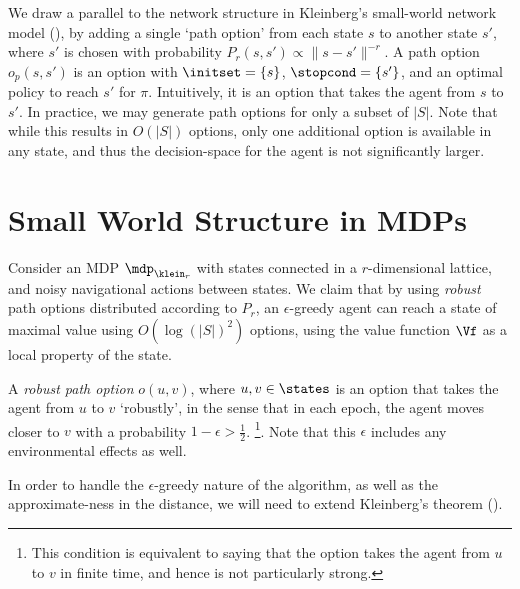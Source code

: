 We draw a parallel to the network structure in Kleinberg's small-world
network model (), by adding a single `path
option' from each state $s$ to another state $s'$, where $s'$ is chosen
with probability $P_r(s,s') \propto \|s-s'\|^{-r}$.  A path option
$o_p(s,s')$ is an option with $\initset = \{s\}$, $\stopcond = \{s'\}$,
and an optimal policy to reach $s'$ for $\pi$.  Intuitively, it is an
option that takes the agent from $s$ to $s'$. In practice, we may
generate path options for only a subset of $|S|$. Note that while this
results in $O(|S|)$ options, only one additional option is available in
any state, and thus the decision-space for the agent is not
significantly larger.

\section{Small World Structure in MDPs}
\label{sec:sw:theory}

Consider an MDP $\mdp_{\klein_r}$ with states connected in
a $r$-dimensional lattice, and noisy navigational actions between
states. We claim that by using {\em robust} path options distributed
according to $P_r$, an $\epsilon$-greedy agent can reach a state of
maximal value using $O(\log(|S|)^2)$ options, using the value function
$\Vf$ as a local property of the state. 

\begin{definition}
    A {\em robust path option} $o(u,v)$, where $u,v \in \states$ is an
    option that takes the agent from $u$ to $v$ `robustly', in the
    sense that in each epoch, the agent moves closer to $v$ with a
    probability $1-\epsilon > \frac{1}{2}$. \footnote{This condition
    is equivalent to saying that the option takes the agent from $u$
    to $v$ in finite time, and hence is not particularly strong.}.
    Note that this $\epsilon$ includes any environmental effects as
    well.
\end{definition}

In order to handle the $\epsilon$-greedy nature of the algorithm, as
well as the approximate-ness in the distance, we will need to extend
Kleinberg's theorem ().

